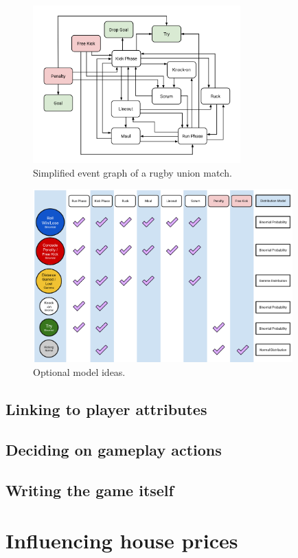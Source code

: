 \documentclass{book}
\begin{document}
\begin{figure}[h]
\includegraphics[width=8cm]{images/trywizard-event-graph.png}
\caption{Simplified event graph of a rugby union match.}
\label{fig:event-graph}
\end{figure}

\begin{figure}[h]
\includegraphics[width=10cm]{images/trywizard-model-ideas-sketch.png}
\caption{Optional model ideas.}
\label{fig:model-ideas}
\end{figure}

\section{\sffamily Linking to player attributes}

\section{\sffamily Deciding on gameplay actions}

\section{\sffamily Writing the game itself}

\chapter{\sffamily Influencing house prices}
\end{document}
